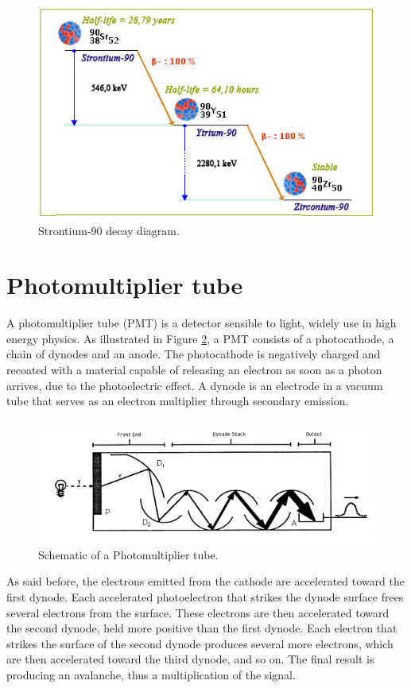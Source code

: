 \documentclass[10pt,swedish, openany]{book}
\begin{document}
\begin{figure}[H]
\includegraphics[scale=0.5]{Sr90.jpg}
\centering
\caption{Strontium-90 decay diagram.}
\label{fig:Sr90}
\end{figure}

\section{Photomultiplier tube}

A photomultiplier tube (PMT) is a detector sensible to light, widely use in high energy physics. As illustrated in Figure \ref{fig:PMT}, a PMT consists of a photocathode, a chain of dynodes and an anode. The photocathode is negatively charged and recoated with a material capable of releasing an electron as soon as a photon arrives, due to the photoelectric effect. A dynode is an electrode in a vacuum tube that serves as an electron multiplier through secondary emission.

\begin{figure}[H]
\includegraphics[scale=0.5]{PMT.png}
\centering
\caption{Schematic of a Photomultiplier tube.}
\label{fig:PMT}
\end{figure}

As said before, the electrons emitted from the cathode are accelerated toward the first dynode. Each accelerated photoelectron that strikes the dynode surface frees several electrons from the surface. These electrons are then accelerated toward the second dynode, held more positive than the first dynode. Each electron that strikes the surface of the second dynode produces several more electrons, which are then accelerated toward the third dynode, and so on. The final result is producing an avalanche, thus a multiplication of the signal.\\
\end{document}
